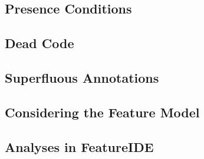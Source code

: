 





\subsection{Presence Conditions}

\subsection{Dead Code} %


\subsection{Superfluous Annotations}


\subsection{Considering the Feature Model}


\subsection{Analyses in FeatureIDE}
